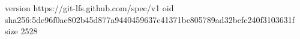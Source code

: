 version https://git-lfs.github.com/spec/v1
oid sha256:5de96f0ae802b45d877a9440459637c41371bc805789ad32befe240f3103631f
size 2528
